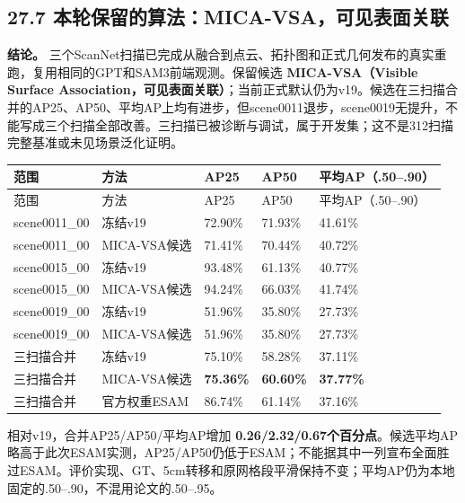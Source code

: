 \documentclass[UTF8,fontset=fandol]{ctexart}
\begin{document}
\subsection*{27.7 本轮保留的算法：MICA-VSA，可见表面关联}

\textbf{结论。} 三个ScanNet扫描已完成从融合到点云、拓扑图和正式几何发布的真实重跑，复用相同的GPT和SAM3前端观测。保留候选 \textbf{MICA-VSA（Visible Surface Association，可见表面关联）}；当前正式默认仍为v19。候选在三扫描合并的AP25、AP50、平均AP上均有进步，但scene0011退步，scene0019无提升，不能写成三个扫描全部改善。三扫描已被诊断与调试，属于开发集；这不是312扫描完整基准或未见场景泛化证明。



{\small
\begin{longtable}{|p{}|p{}|p{}|p{}|p{}|}
\hline
范围 & 方法 & AP25 & AP50 & 平均AP（.50–.90） \\ \hline
\endfirsthead
\hline
范围 & 方法 & AP25 & AP50 & 平均AP（.50–.90） \\ \hline
\endhead
scene0011\_00 & 冻结v19 & 72.90\% & 71.93\% & 41.61\% \\ \hline
scene0011\_00 & MICA-VSA候选 & 71.41\% & 70.44\% & 40.72\% \\ \hline
scene0015\_00 & 冻结v19 & 93.48\% & 61.13\% & 40.77\% \\ \hline
scene0015\_00 & MICA-VSA候选 & 94.24\% & 66.03\% & 41.74\% \\ \hline
scene0019\_00 & 冻结v19 & 51.96\% & 35.80\% & 27.73\% \\ \hline
scene0019\_00 & MICA-VSA候选 & 51.96\% & 35.80\% & 27.73\% \\ \hline
三扫描合并 & 冻结v19 & 75.10\% & 58.28\% & 37.11\% \\ \hline
三扫描合并 & MICA-VSA候选 & \textbf{75.36\%} & \textbf{60.60\%} & \textbf{37.77\%} \\ \hline
三扫描合并 & 官方权重ESAM & 86.74\% & 61.14\% & 37.16\% \\ \hline
\end{longtable}
}

相对v19，合并AP25/AP50/平均AP增加 \textbf{0.26/2.32/0.67个百分点}。候选平均AP略高于此次ESAM实测，AP25/AP50仍低于ESAM；不能据其中一列宣布全面胜过ESAM。评价实现、GT、5cm转移和原网格段平滑保持不变；平均AP仍为本地固定的.50–.90，不混用论文的.50–.95。
\end{document}
